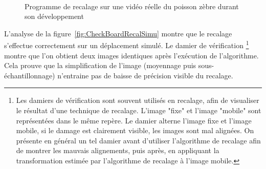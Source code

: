 \begin{figure}[h]
  \centering
  \\
  \caption{Programme de recalage sur une vidéo réelle du poisson zèbre durant son développement}
  \label{fig:CheckBoardRecalReal}
\end{figure}


L'analyse de la figure~\ref{fig:CheckBoardRecalSimu} montre que le recalage s'effectue correctement sur un déplacement simulé. Le damier de vérification
\footnote{Les damiers de vérification sont souvent utilisés en recalage, afin de visualiser le résultat d'une technique de recalage. L'image "fixe" et l'image "mobile" sont représentées dans le même repère. Le damier alterne l'image fixe et l'image mobile, si le damage est clairement visible, les images sont mal alignées. On présente en général un tel damier avant d'utiliser l'algorithme de recalage afin de montrer les mauvais alignements, puis après, en appliquant la transformation estimée par l'algorithme de recalage à l'image mobile.}
montre que l'on obtient deux images identiques après l'exécution de l'algorithme.
Cela prouve que la simplification de l'image (moyennage puis sous-échantillonnage)
n'entraine pas de baisse de précision visible du recalage.

